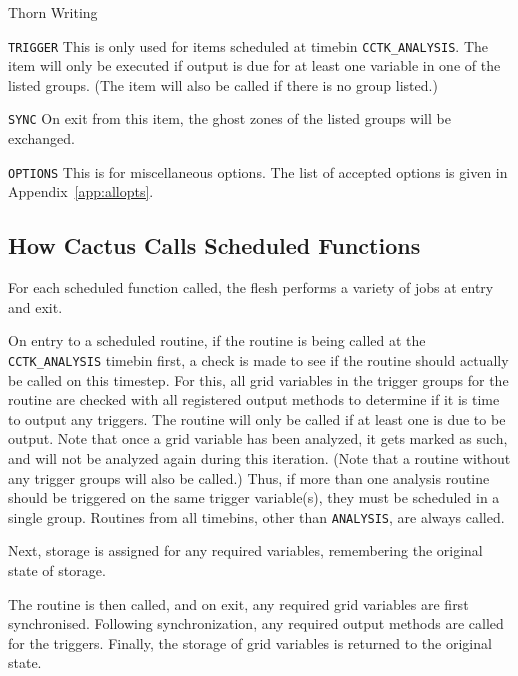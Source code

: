 \begin{cactuspart}{Thorn Writing}
\begin{Lentry}
\item[\texttt{TRIGGER}]
This is only used for items scheduled at timebin \texttt{CCTK\_ANALYSIS}.
The item will only be executed if output is due for at least one
variable in one of the listed groups.  (The item will also be called
if there is no group listed.)
\item[\texttt{SYNC}]
On exit from this item, the ghost zones of the listed groups will be
exchanged.
\item[\texttt{OPTIONS}]
This is for miscellaneous options.  The list of accepted options is
given in Appendix~\ref{app:allopts}.
\end{Lentry}


\subsection{How Cactus Calls Scheduled Functions}
\label{scheduling:calling_scheduled_functions}

For each scheduled function called, the flesh performs a variety of jobs
at entry and exit.

On entry to a scheduled routine, if the routine is being called at the
\texttt{CCTK\_ANALYSIS} timebin first, a check is made to see if the routine should
actually be called on this timestep. For this, all grid variables in the
trigger groups for the routine are checked with all registered output
methods to determine if it is time to output any triggers. The routine
will only be called if at least one is due to be output. Note that once
a grid variable has been analyzed, it gets marked as such, and will not
be analyzed again during this iteration.
(Note that a routine without any trigger groups will also be called.)
Thus, if more than one analysis
routine should be triggered on the same trigger variable(s), they must
be scheduled in a single group. Routines from all timebins, other than \texttt{ANALYSIS}, are always called.

Next, storage is assigned for any required variables, remembering the
original state of storage.

The routine is then called, and on exit, any required grid variables are
first synchronised. Following synchronization, any required output methods
are called for the triggers. Finally, the storage of grid variables is
returned to the original state.



\end{cactuspart}

